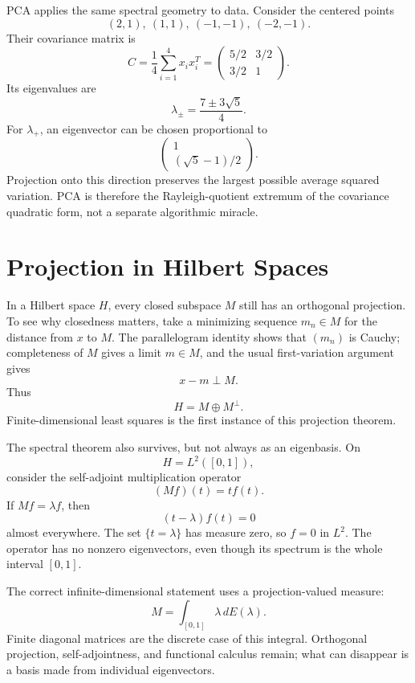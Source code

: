 PCA applies the same spectral geometry to data.  Consider the centered points
\[
  (2,1),\ (1,1),\ (-1,-1),\ (-2,-1).
\]
Their covariance matrix is
\[
  C=\frac14
  \sum_{i=1}^4x_ix_i^T
  =
  \begin{pmatrix}
    5/2&3/2\\
    3/2&1
  \end{pmatrix}.
\]
Its eigenvalues are
\[
  \lambda_{\pm}
  =\frac{7\pm3\sqrt5}{4}.
\]
For \(\lambda_+\), an eigenvector can be chosen proportional to
\[
  \begin{pmatrix}
    1\\(\sqrt5-1)/2
  \end{pmatrix}.
\]
Projection onto this direction preserves the largest possible average squared variation.  PCA is therefore the Rayleigh-quotient extremum of the covariance quadratic form, not a separate algorithmic miracle.

\section{Projection in Hilbert Spaces}

In a Hilbert space \(H\), every closed subspace \(M\) still has an orthogonal projection.  To see why closedness matters, take a minimizing sequence \(m_n\in M\) for the distance from \(x\) to \(M\).  The parallelogram identity shows that \((m_n)\) is Cauchy; completeness of \(M\) gives a limit \(m\in M\), and the usual first-variation argument gives
\[
  x-m\perp M.
\]
Thus
\[
  H=M\oplus M^\perp.
\]
Finite-dimensional least squares is the first instance of this projection theorem.

The spectral theorem also survives, but not always as an eigenbasis.  On
\[
  H=L^2([0,1]),
\]
consider the self-adjoint multiplication operator
\[
  (Mf)(t)=t f(t).
\]
If \(Mf=\lambda f\), then
\[
  (t-\lambda)f(t)=0
\]
almost everywhere.  The set \(\{t=\lambda\}\) has measure zero, so \(f=0\) in \(L^2\).  The operator has no nonzero eigenvectors, even though its spectrum is the whole interval \([0,1]\).

The correct infinite-dimensional statement uses a projection-valued measure:
\[
  M=\int_{[0,1]}\lambda\,dE(\lambda).
\]
Finite diagonal matrices are the discrete case of this integral.  Orthogonal projection, self-adjointness, and functional calculus remain; what can disappear is a basis made from individual eigenvectors.